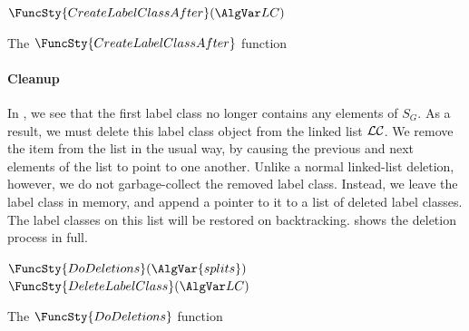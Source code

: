\begin{algorithm}[htb]
\AlgorithmFontSize
\DontPrintSemicolon
\nl $\FuncSty{CreateLabelClassAfter}(\LC)$ \;
\nl {}
\caption{The $\FuncSty{CreateLabelClassAfter}$ function}
\label{McSplitSIAlgCreateLC}
\end{algorithm}

\paragraph{Cleanup}
In , we see that the first label class
no longer contains any elements of $S_G$.  As a result, we must delete this label
class object from the linked list $\mathcal{LC}$.
We remove the item from the list in the usual way,
by causing the previous and next elements of the list to point to one
another.
Unlike a normal linked-list deletion, however,
we do not garbage-collect the removed label class.  Instead,
we leave the label class in memory, and append a pointer
to it to a list of deleted label classes.  The label
classes on this list will be restored on backtracking.
 shows the deletion process in full.

\begin{algorithm}[htb]
\AlgorithmFontSize
\DontPrintSemicolon
\nl $\FuncSty{DoDeletions}(\AlgVar{splits})$ \;
\nl {}
\;
\nl $\FuncSty{DeleteLabelClass}(\LC)$ \;
\nl {}
\caption{The $\FuncSty{DoDeletions}$ function}
\label{McSplitSIAlgDelete}
\end{algorithm}

